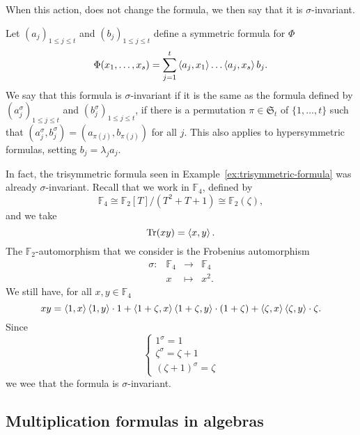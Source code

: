 When this action, does not change the formula, we then say that it is
$\sigma$-invariant.
\begin{defi}
  Let $(a_j)_{1\leq j\leq t}$ and
$(b_j)_{1\leq j\leq t}$ define a symmetric formula for $\Phi$
  \[
    \Phi(x_1, \dots, x_s) = \sum_{j=1}^t\left\langle a_j,x_1\right\rangle\dots\left\langle a_j,x_s\right\rangle b_j.
  \]
We say that this
formula is $\sigma$-invariant if it is the same as the formula defined by
$(a_j^\sigma)_{1\leq j\leq t}$ and $(b_j^\sigma)_{1\leq j\leq t}$,
\ie if there is a permutation $\pi\in\mathfrak S_t$ of $\{1,\dots,t\}$ such that
$(a_j^\sigma,b_j^\sigma)=(a_{\pi(j)},b_{\pi(j)})$ for all $j$. This also applies
to hypersymmetric formulas, setting $b_j=\lambda_j a_j$. 
\end{defi}
\begin{ex}
  In fact, the trisymmetric formula seen in
  Example~\ref{ex:trisymmetric-formula} was already $\sigma$-invariant. Recall
  that we work in $\mathbb{F}_4$, defined by
  \[
   \mathbb{F}_4\cong\mathbb{F}_2[T]/(T^2+T+1)\cong\mathbb{F}_2(\zeta),
  \]
  and we take
\[
  \operatorname{Tr}(xy) = \left\langle x,y\right\rangle.
\]
The $\mathbb{F}_2$-automorphism that we consider is the Frobenius automorphism
\[
  \begin{array}{cccc}
    \sigma: & \mathbb{F}_4 & \to & \mathbb{F}_4 \\
    & x & \mapsto & x^2.
  \end{array}
\]
We still have, for all $x, y\in\mathbb{F}_4$
\[
  xy =
  \left\langle1,x\right\rangle\left\langle1,y\right\rangle\cdot1+\left\langle1+\zeta,x\right\rangle\left\langle1+\zeta,y\right\rangle\cdot(1+\zeta)+\left\langle\zeta,x\right\rangle\left\langle\zeta,y\right\rangle\cdot\zeta.
\]
Since
\[
\left\{ 
  \begin{array}{lll}
    1^\sigma = 1 \\
    \zeta^\sigma=\zeta+1\\
    (\zeta+1)^\sigma=\zeta
  \end{array}
\right.
\]
we wee that the formula is $\sigma$-invariant.
\end{ex}

\subsection{Multiplication formulas in algebras}

